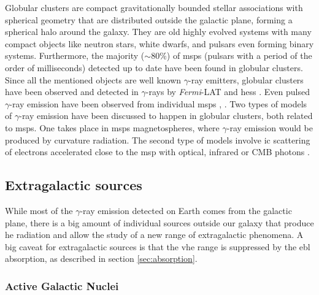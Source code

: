 \documentclass[main.tex]{subfiles}
\begin{document}
Globular clusters are compact gravitationally bounded stellar associations with spherical geometry that are distributed outside the galactic plane, forming a spherical halo around the galaxy. They are old highly evolved systems with many compact objects like neutron stars, white dwarfs, and pulsars even forming binary systems. Furthermore, the majority  ($\sim 80\%$) of \glspl{msp} (pulsars with a period of the order of milliseconds) detected up to date have been found in globular clusters.
Since all the mentioned objects are well known $\gamma$-ray emitters, globular clusters have been observed and  detected in $\gamma$-rays by \textit{Fermi}-LAT \cite{2010globularclusterspopulationfermi} and \gls{hess}  \cite{2013globularclustersHESS}. Even pulsed $\gamma$-ray emission have been observed from individual \glspl{msp} \cite{2011detectionpulsationglobularcluster}, \cite{2013PulsedemissionfromGlobularM28}. 
Two types of models of $\gamma$-ray emission have been discussed to happen in globular clusters, both related to \glspl{msp}. One takes place in \glspl{msp} magnetospheres, where $\gamma$-ray emission would be produced by curvature radiation. The second type of models involve \gls{ic} scattering of electrons accelerated close to the \gls{msp} with optical, infrared or CMB photons \cite{2016GlobularClustersFermi}.  

\subsection{Extragalactic sources}

While most of the $\gamma$-ray emission detected on Earth comes from the galactic plane, there is a big amount of individual sources outside our galaxy that produce \gls{he} radiation and allow the study of a new range of extragalactic phenomena. A big caveat for extragalactic sources is that the \gls{vhe} range is suppressed by the \gls{ebl} absorption, as described in section \ref{sec:absorption}.

\subsubsection{Active Galactic Nuclei}
\end{document}
